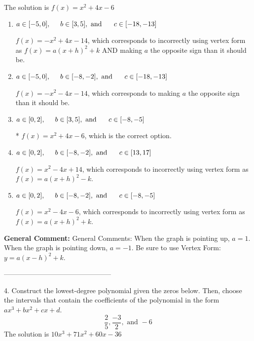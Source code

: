 \documentclass{extbook}[14pt]
\begin{document}
The solution is $ f(x) = x^{2} +4 x -6 $ 

\begin{enumerate}[label=\Alph*.] 
\item $ a \in [-5, 0], \hspace*{5mm} b \in [3, 5], \text{ and } \hspace*{5mm} c \in [-18, -13] $ 

 $f(x)=-x^{2} +4 x -14$, which corresponds to incorrectly using vertex form as $f(x) = a(x+h)^2+k$ AND making $a$ the opposite sign than it should be. 
\item $ a \in [-5, 0], \hspace*{5mm} b \in [-8, -2], \text{ and } \hspace*{5mm} c \in [-18, -13] $ 

 $f(x)=-x^{2} -4 x -14$, which corresponds to making $a$ the opposite sign than it should be. 
\item $ a \in [0, 2], \hspace*{5mm} b \in [3, 5], \text{ and } \hspace*{5mm} c \in [-8, -5] $ 

 * $f(x)=x^{2} +4 x -6$, which is the correct option. 
\item $ a \in [0, 2], \hspace*{5mm} b \in [-8, -2], \text{ and } \hspace*{5mm} c \in [13, 17] $ 

 $f(x)=x^{2} -4 x + 14$, which corresponds to incorrectly using vertex form as $f(x) = a(x+h)^2 - k$. 
\item $ a \in [0, 2], \hspace*{5mm} b \in [-8, -2], \text{ and } \hspace*{5mm} c \in [-8, -5] $ 

 $f(x)=x^{2} -4 x -6$, which corresponds to incorrectly using vertex form as $f(x) = a(x+h)^2+k$. 
\end{enumerate} 
 
\textbf{General Comment:} General Comments: When the graph is pointing up, $a=1$. When the graph is pointing down, $a=-1$. Be sure to use Vertex Form: $y = a(x-h)^2+k$. 

-----------------------------------------------

4. Construct the lowest-degree polynomial given the zeros below. Then, choose the intervals that contain the coefficients of the polynomial in the form $ax^3+bx^2+cx+d$.
\[ \frac{2}{5}, \frac{-3}{2}, \text{ and } -6 \] 
The solution is $ 10x^{3} +71 x^{2} +60 x -36 $ 
\end{document}
